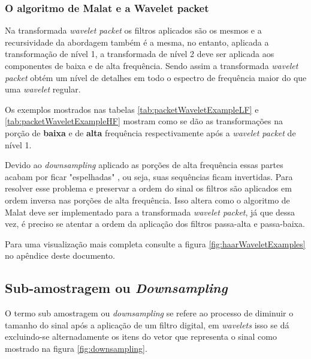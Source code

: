 			

		\subsubsection{O algoritmo de Malat e a Wavelet packet}
			\par Na transformada \textit{wavelet packet} os filtros aplicados são os mesmos e a recursividade da abordagem também é a mesma, no entanto, aplicada a transformação de nível 1, a transformada de nível 2 deve ser aplicada aos componentes de baixa e de alta frequência. Sendo assim a transformada \textit{wavelet packet} obtém um nível de detalhes em todo o espectro de frequência maior do que uma \textit{wavelet} regular. 
			
			\par Os exemplos mostrados nas tabelas \ref{tab:packetWaveletExampleLF} e \ref{tab:packetWaveletExampleHF} mostram como se dão as transformações na porção de \textbf{baixa} e de \textbf{alta} frequência respectivamente após a \textit{wavelet packet} de nível 1.

			\par Devido ao \textit{downsampling} aplicado as porções de alta frequência essas partes acabam por ficar "espelhadas" \cite{Jensen_2001}, ou seja, suas sequências ficam invertidas. Para resolver  esse problema e preservar a ordem do sinal os filtros são aplicados em ordem inversa nas porções de alta frequência. Isso altera como o algoritmo de Malat deve ser implementado para a transformada \textit{wavelet packet}, já que dessa vez, é preciso se atentar a ordem da aplicação dos filtros passa-alta e passa-baixa.

			
			
			\par Para uma visualização mais completa consulte a figura \ref{fig:haarWaveletExamples} no apêndice deste documento.
			
		\subsection{Sub-amostragem ou \textit{Downsampling}}
			\par O termo sub amostragem ou \textit{downsampling} se refere ao processo de diminuir o tamanho do sinal após a aplicação de um  filtro digital, em \textit{wavelets} isso se dá excluindo-se alternadamente os itens do vetor que representa o sinal como mostrado na figura \ref{fig:downsampling}.
			
